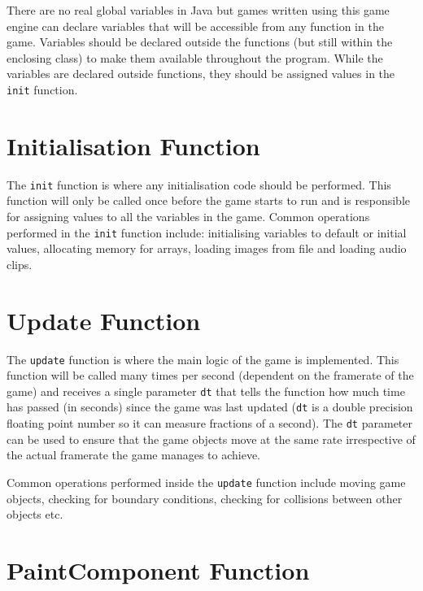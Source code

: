 \documentclass[a4paper, 10pt]{report}
\begin{document}
There are no real global variables in Java but games written using this game engine can declare variables that will be accessible from any function in the game. Variables should be declared outside the functions (but still within the enclosing class) to make them available throughout the program. While the variables are declared outside functions, they should be assigned values in the {\tt init} function.

\section*{Initialisation Function} \nonumber

The {\tt init} function is where any initialisation code should be performed. This function will only be called once before the game starts to run and is responsible for assigning values to all the variables in the game. Common operations performed in the {\tt init} function include: initialising variables to default or initial values, allocating memory for arrays, loading images from file and loading audio clips.

\section*{Update Function} \nonumber

The {\tt update} function is where the main logic of the game is implemented. This function will be called many times per second (dependent on the framerate of the game) and receives a single parameter {\tt dt} that tells the function how much time has passed (in seconds) since the game was last updated ({\tt dt} is a double precision floating point number so it can measure fractions of a second). The {\tt dt} parameter can be used to ensure that the game objects move at the same rate irrespective of the actual framerate the game manages to achieve.

Common operations performed inside the {\tt update} function include moving game objects, checking for boundary conditions, checking for collisions between other objects etc.

\section*{PaintComponent Function} \nonumber
\end{document}
